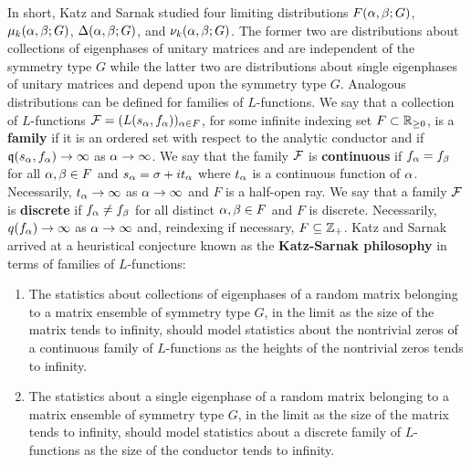     In short, Katz and Sarnak studied four limiting distributions $F(\alpha,\beta;G)$, $\mu_{k}(\alpha,\beta;G)$, $\Delta(\alpha,\beta;G)$, and $\nu_{k}(\alpha,\beta;G)$. The former two are distributions about collections of eigenphases of unitary matrices and are independent of the symmetry type $G$ while the latter two are distributions about single eigenphases of unitary matrices and depend upon the symmetry type $G$. Analogous distributions can be defined for families of $L$-functions. We say that a collection of $L$-functions $\mathcal{F} = (L(s_{\alpha},f_{\alpha}))_{\alpha \in F}$, for some infinite indexing set $F \subset \mathbb{R}_{\ge 0}$, is a \textbf{family} if it is an ordered set with respect to the analytic conductor and if $\mathfrak{q}(s_{\alpha},f_{\alpha}) \to \infty$ as $\alpha \to \infty$. We say that the family $\mathcal{F}$ is \textbf{continuous} if $f_{\alpha} = f_{\beta}$ for all $\alpha,\beta \in F$ and $s_{\alpha} = \sigma+it_{\alpha}$ where $t_{\alpha}$ is a continuous function of $\alpha$. Necessarily, $t_{\alpha} \to \infty$ as $\alpha \to \infty$ and $F$ is a half-open ray. We say that a family $\mathcal{F}$ is \textbf{discrete} if $f_{\alpha} \neq f_{\beta}$ for all distinct $\alpha,\beta \in F$ and $F$ is discrete. Necessarily, $q(f_{\alpha}) \to \infty$ as $\alpha \to \infty$ and, reindexing if necessary, $F \subseteq \mathbb{Z}_{+}$. Katz and Sarnak arrived at a heuristical conjecture known as the \textbf{Katz-Sarnak philosophy} in terms of families of $L$-functions:

    \begin{conjecture*}
      \phantom{ }
      \begin{enumerate}[label*=(\roman*)]
        \item The statistics about collections of eigenphases of a random matrix belonging to a matrix ensemble of symmetry type $G$, in the limit as the size of the matrix tends to infinity, should model statistics about the nontrivial zeros of a continuous family of $L$-functions as the heights of the nontrivial zeros tends to infinity.
        \item The statistics about a single eigenphase of a random matrix belonging to a matrix ensemble of symmetry type $G$, in the limit as the size of the matrix tends to infinity, should model statistics about a discrete family of $L$-functions as the size of the conductor tends to infinity.
      \end{enumerate}
    \end{conjecture*}

